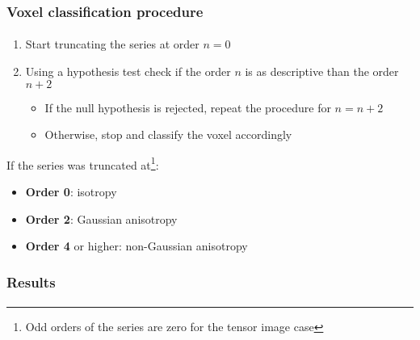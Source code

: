 \documentclass[10pt]{beamer}
\begin{document}
\begin{frame}
  \frametitle{Voxel classification procedure}
  \framesubtitle{}

  \begin{enumerate}
    \item Start truncating the series at order $n = 0$
    \item Using a hypothesis test check if the order $n$ is as descriptive than the order $n + 2$
      \begin{itemize}
        \item If the null hypothesis is rejected, repeat the procedure for $n = n + 2$
        \item Otherwise, stop and classify the voxel accordingly
      \end{itemize}
  \end{enumerate}

  If the series was truncated at\footnote{Odd orders of the series are zero for the tensor image case}:
  \begin{itemize}
    \item \textbf{Order 0}: isotropy
    \item \textbf{Order 2}: Gaussian anisotropy
    \item \textbf{Order 4} or higher: non-Gaussian anisotropy
  \end{itemize}
\end{frame}

\begin{frame}

\end{frame}
  \frametitle{Results}
  \framesubtitle{}
\end{document}
